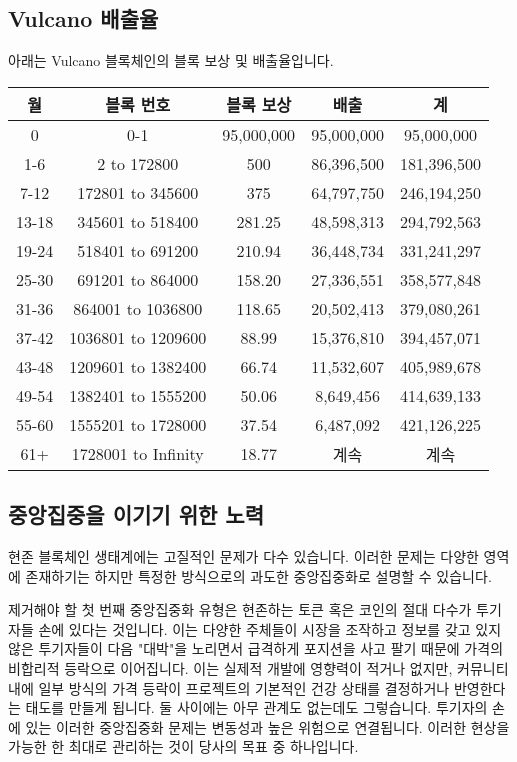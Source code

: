\documentclass[A4paper, 12pt]{article}
\begin{document}
\subsection{Vulcano 배출율}
아래는 Vulcano 블록체인의 블록 보상 및 배출율입니다.
\begin{table}[h]
\centering
\begin{tabular}{@{}ccccc@{}}
\toprule
월 & 블록 번호 & 블록 보상 & 배출 & 계 \\ \midrule
0 & 0-1 & 95,000,000 & 95,000,000 & 95,000,000 \\
1-6 & 2 to 172800 & 500 & 86,396,500 & 181,396,500 \\
7-12 & 172801 to 345600 & 375 & 64,797,750 & 246,194,250 \\
13-18 & 345601 to 518400 & 281.25 & 48,598,313 & 294,792,563 \\
19-24 & 518401 to 691200 & 210.94 & 36,448,734 & 331,241,297 \\
25-30 & 691201 to 864000 & 158.20 & 27,336,551 & 358,577,848 \\
31-36 & 864001 to 1036800 & 118.65 & 20,502,413 & 379,080,261 \\
37-42 & 1036801 to 1209600 & 88.99 & 15,376,810 & 394,457,071 \\
43-48 & 1209601 to 1382400 & 66.74 & 11,532,607 & 405,989,678 \\
49-54 & 1382401 to 1555200 & 50.06 & 8,649,456 & 414,639,133 \\
55-60 & 1555201 to 1728000 & 37.54 & 6,487,092 & 421,126,225 \\
61+ & 1728001 to Infinity & 18.77 & 계속 & 계속 \\ \bottomrule
\end{tabular}
\end{table}

\subsection{중앙집중을 이기기 위한 노력}
현존 블록체인 생태계에는 고질적인 문제가 다수 있습니다. 이러한 문제는 다양한 영역에 존재하기는 하지만 특정한 방식으로의 과도한 중앙집중화로 설명할 수 있습니다.

제거해야 할 첫 번째 중앙집중화 유형은 현존하는 토큰 혹은 코인의 절대 다수가 투기자들 손에 있다는 것입니다. 이는 다양한 주체들이 시장을 조작하고 정보를 갖고 있지 않은 투기자들이 다음 "대박"을 노리면서 급격하게 포지션을 사고 팔기 때문에 가격의 비합리적 등락으로 이어집니다. 이는 실제적 개발에 영향력이 적거나 없지만, 커뮤니티 내에 일부 방식의 가격 등락이 프로젝트의 기본적인 건강 상태를 결정하거나 반영한다는 태도를 만들게 됩니다. 둘 사이에는 아무 관계도 없는데도 그렇습니다. 투기자의 손에 있는 이러한 중앙집중화 문제는 변동성과 높은 위험으로 연결됩니다. 이러한 현상을 가능한 한 최대로 관리하는 것이 당사의 목표 중 하나입니다.
\end{document}
